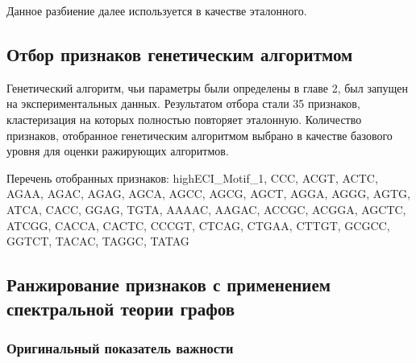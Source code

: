 Данное разбиение далее используется в качестве эталонного.

\subsection{Отбор признаков генетическим алгоритмом}
Генетический алгоритм, чьи параметры были определены в главе 2, был запущен на экспериментальных данных. Результатом отбора стали 35 признаков, кластеризация на которых полностью повторяет эталонную. Количество признаков, отобранное генетическим алгоритмом выбрано в качестве базового уровня для оценки ражирующих алгоритмов. 

Перечень отобранных признаков: highECI\_Motif\_1, CCC, ACGT, ACTC, AGAA, AGAC, AGAG, AGCA, AGCC, AGCG, AGCT, AGGA, AGGG, AGTG, ATCA, CACC, GGAG, TGTA, AAAAC, AAGAC, ACCGC, ACGGA, AGCTC, ATCGG, CACCA, CACTC, CCCGT, CTCAG, CTGAA, CTTGT, GCGCC, GGTCT, TACAC, TAGGC, TATAG

\subsection{Ранжирование признаков с применением спектральной теории графов}

\subsubsection{Оригинальный показатель важности}


